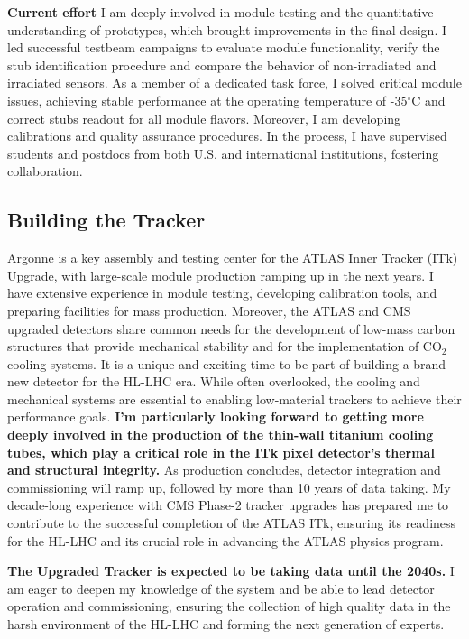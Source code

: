 {\begin{flushleft}
\textbf{Current effort}
I am deeply involved in module testing and the quantitative understanding of prototypes, which brought improvements in the final design. I led successful testbeam campaigns to evaluate module functionality, verify the stub identification procedure and compare the behavior of non-irradiated and irradiated sensors. As a member of a dedicated task force, I solved critical module issues, achieving stable performance at the operating temperature of -35$^{\circ}$C and correct stubs readout for all module flavors. Moreover, I am developing calibrations and quality assurance procedures. In the process, I have supervised students and postdocs from both U.S. and international institutions, fostering collaboration.
\vskip 5pt 
\subsection{Building the Tracker}
\vskip 5pt 
Argonne is a key assembly and testing center for the ATLAS Inner Tracker (ITk) Upgrade, with large-scale module production ramping up in the next years. I have extensive experience in module testing, developing calibration tools, and preparing facilities for mass production. Moreover, the ATLAS and CMS upgraded detectors share common needs for the development of low-mass carbon structures that provide mechanical stability and for the implementation of CO$_2$ cooling systems. 
It is a unique and exciting time to be part of building a brand-new detector for the HL-LHC era. While often overlooked, the cooling and mechanical systems are essential to enabling low-material trackers to achieve their performance goals. {\bf I’m particularly looking forward to getting more deeply involved in the production of the thin-wall titanium cooling tubes, which play a critical role in the ITk pixel detector’s thermal and structural integrity.}
As production concludes, detector integration and commissioning will ramp up, followed by more than 10 years of data taking. My decade-long experience with CMS Phase-2 tracker upgrades has prepared me to contribute to the successful completion of the ATLAS ITk, ensuring its readiness for the HL-LHC and its crucial role in advancing the ATLAS physics program.

{\bf The Upgraded Tracker is expected to be taking data until the 2040s.} I am eager to deepen my knowledge of the system and be able to lead detector operation and commissioning, ensuring the collection of high quality data in the harsh environment of the HL-LHC and forming the next generation of experts.


\end{flushleft}}
